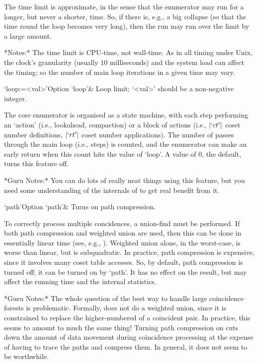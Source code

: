 The time  limit is approximate, in  the sense that  the enumerator may
run for a longer, but never a shorter, time.  So, if there is, e.g., a
big collapse (so that the time round the loop becomes very long), then
the run may run over the limit by a large amount.

*Notes:*
The time limit is CPU-time, not wall-time.  As  in  all  timing  under
Unix, the clock's granularity  (usually  $10$  milliseconds)  and  the
system load can  affect  the  timing;  so  the  number  of  main  loop
iterations in a given time may vary.

\>`loop:=<val>'{Option `loop'}&
Loop limit; `<val>' should be a non-negative integer.

The core enumerator is organised as a state machine,  with  each  step
performing an \lq{}action' (i.e., lookahead, compaction) or a block of
actions (i.e.,  $|`ct'|$  coset  number  definitions,  $|`rt'|$  coset
number applications). The number  of  passes  through  the  main  loop
(i.e., steps) is counted, and the enumerator can make an early  return
when this count hits the value of `loop'. A value of $0$, the default,
turns this feature off.

*Guru Notes:*
You can do lots of really neat things using this feature, but you need
some understanding of the internals of {\ACE} to get real benefit from
it.

\>`path'{Option `path'}&
Turns on path compression.

To correctly  process  multiple  concidences,  a  union-find  must  be
performed. If both path compression and weighted union are used,  then
this can be done in essentially linear time (see, e.g., \cite{CLR90}).
Weighted union alone, in the worst-case, is worse than linear, but  is
subquadratic. In practice, path compression  is  expensive,  since  it
involves many coset table accesses. So, by default,  path  compression
is turned off; it can be turned on by `path'. It has no effect on  the
result, but may affect the running time and the internal statistics.

*Guru Notes:*
The whole question of the best way to handle large coincidence forests
is problematic.  Formally, {\ACE} does  not do a weighted union, since
it is constrained to replace the higher-numbered of a coincident pair.
In practice,  this seems  to amount to  much the same  thing!  Turning
path  compression on  cuts down  the  amount of  data movement  during
coincidence processing at the expense of having to trace the paths and
compress them.  In general, it does not seem to be worthwhile.

